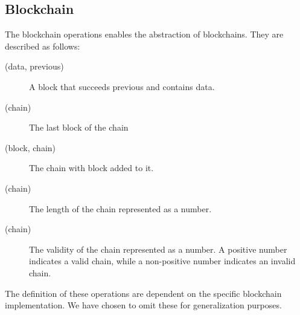 \FloatBarrier

\subsection{Blockchain}

The blockchain operations enables the abstraction of blockchains.
They are described as follows:

\begin{description}
	\item[(data, previous)]
	A block that succeeds previous and contains data.
	\item[(chain)]
	The last block of the chain
	\item[(block, chain)]
	The chain with block added to it.
	\item[(chain)]
	The length of the chain represented as a number.
	\item[(chain)]
	The validity of the chain represented as a number. A positive number indicates a valid chain, while a non-positive number indicates an invalid chain.
\end{description}

The definition of these operations are dependent on the specific blockchain implementation. We have chosen to omit these for generalization purposes.

